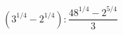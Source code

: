 \begin{ex}[type=calculate]
	\begin{condition}
		\( \left( 3^{1/4}-2^{1/4} \right):\dfrac{48^{1/4}-2^{5/4}}{3} \)
	\end{condition}
\end{ex}